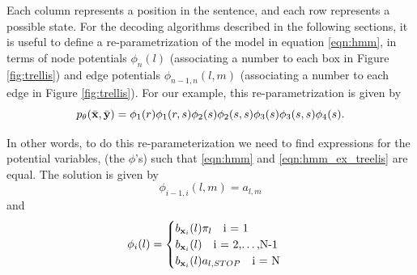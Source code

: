 Each column represents a position in the sentence, and each row represents a possible state. 
For the decoding algorithms described in the following sections, it is
useful to define a re-parametrization of the model in equation \eqref{eqn:hmm}, in terms of
node potentials $\phi_n(l)$ (associating a number to each box in Figure \ref{fig:trellis})
and edge potentials $\phi_{n-1,n}(l,m)$ (associating a number to each edge in  Figure
\ref{fig:trellis}). For our example, this re-parametrization is given by
%
\begin{equation}
  p_{\theta}(\bar{\mathbf{x}} ,\bar{\mathbf{y}}) =\phi_1(r)\phi_1(r,s)\phi_2(s)\phi_2(s,s)\phi_3(s)\phi_3(s,s)\phi_4(s).
  \label{eqn:hmm_ex_treelis}
\end{equation}


In other words, to do this re-parameterization we need to find expressions for the potential variables, (the $\phi$'s) such that \eqref{eqn:hmm} and \eqref{eqn:hmm_ex_treelis} are equal. The solution is given by
\begin{equation}
\phi_{i-1,i}(l,m) = a_{l,m}
\label{eq:nodes1}
\end{equation}
and
\begin{equation}
\phi_i(l) = 
\begin{cases}
 b_{\mathbf{x}_i}(l)\pi_l \quad\text{i = 1}\\
 b_{\mathbf{x}_i}(l) \quad\text{i = 2,\ldots,N-1}\\
 b_{\mathbf{x}_i}(l)a_{l,STOP} \quad\text{i = N}
 \label{eq:nodes2}
\end{cases}
\end{equation}



